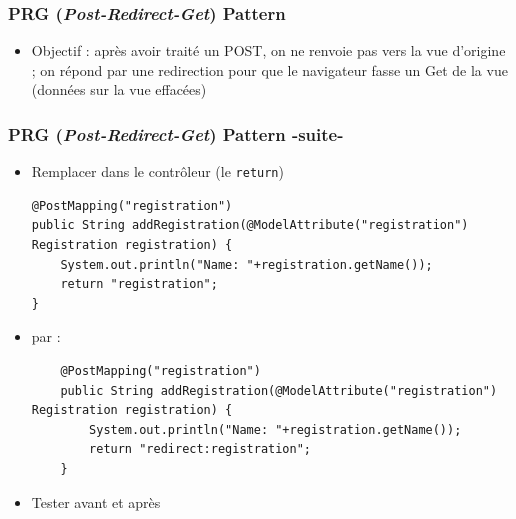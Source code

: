 \documentclass{beamer}
\begin{document}
\begin{frame}
	\frametitle{PRG (\textit{Post-Redirect-Get}) Pattern}
\begin{itemize}
	\vspace{5.5cm}
	\item Objectif : après avoir traité un POST, on ne renvoie pas vers la vue d'origine ; on répond par une redirection pour que le navigateur fasse un Get de la vue (données sur la vue effacées)
\end{itemize}
\end{frame} 

\begin{frame}[fragile]
	\frametitle{PRG (\textit{Post-Redirect-Get}) Pattern -suite-}
\begin{itemize}
	\item Remplacer dans le contrôleur (le \texttt{return})
\begin{lstlisting}
@PostMapping("registration")
public String addRegistration(@ModelAttribute("registration") Registration registration) {
	System.out.println("Name: "+registration.getName());
	return "registration";
}
\end{lstlisting}	

\item par :
\begin{lstlisting}
	@PostMapping("registration")
	public String addRegistration(@ModelAttribute("registration") Registration registration) {
		System.out.println("Name: "+registration.getName());
		return "redirect:registration";
	}
\end{lstlisting}
\item Tester avant et après
\end{itemize}
\end{frame} 
\end{document}
